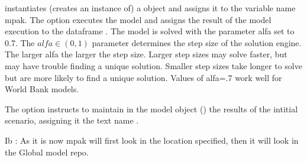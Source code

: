 \documentclass[letterpaper,10pt,english]{jupyterBook}
\begin{document}
\sphinxAtStartPar
instantiates (creates an instance of) a  object and assigns it to the variable name mpak.  The  option executes the model and assigns the result of the model execution to the dataframe .  The model is solved with the parameter alfa set to 0.7.  The \(alfa \in (0,1)\) parameter determines the step size of the solution engine. The larger alfa the larger the step size. Larger step sizes may solve faster, but may have trouble finding a unique solution.  Smaller step sizes take longer to solve but are more likely to find a unique solution.  Values of alfa=.7 work well for World Bank models.

\sphinxAtStartPar
The  option instructs  to maintain in the model object () the results of the intitial scenario, assigning it the text name .

\sphinxAtStartPar
Ib : As it is now mpak will first look in the location specified, then
it will look in the Global model repo. 
\end{document}
